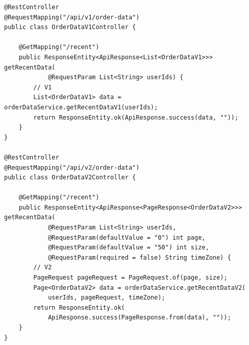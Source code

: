 \begin{lstlisting}[style=java]
@RestController
@RequestMapping("/api/v1/order-data")
public class OrderDataV1Controller {
    
    @GetMapping("/recent")
    public ResponseEntity<ApiResponse<List<OrderDataV1>>> getRecentData(
            @RequestParam List<String> userIds) {
        // V1
        List<OrderDataV1> data = orderDataService.getRecentDataV1(userIds);
        return ResponseEntity.ok(ApiResponse.success(data, ""));
    }
}

@RestController  
@RequestMapping("/api/v2/order-data")
public class OrderDataV2Controller {
    
    @GetMapping("/recent")
    public ResponseEntity<ApiResponse<PageResponse<OrderDataV2>>> getRecentData(
            @RequestParam List<String> userIds,
            @RequestParam(defaultValue = "0") int page,
            @RequestParam(defaultValue = "50") int size,
            @RequestParam(required = false) String timeZone) {
        // V2
        PageRequest pageRequest = PageRequest.of(page, size);
        Page<OrderDataV2> data = orderDataService.getRecentDataV2(
            userIds, pageRequest, timeZone);
        return ResponseEntity.ok(
            ApiResponse.success(PageResponse.from(data), ""));
    }
}
\end{lstlisting}

\hypertarget{section-73}{%
\subsection{}\label{section-73}}

\hypertarget{section-74}{%
\subsubsection{}\label{section-74}}

